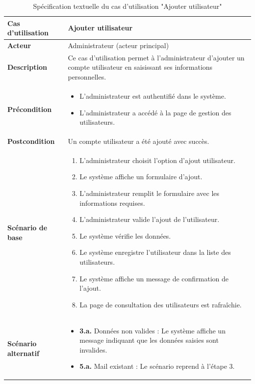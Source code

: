 \documentclass[a4paper,11pt]{report}
\begin{document}
\begin{table}[H]
  \centering
  \renewcommand{\arraystretch}{1.5}
  \caption{Spécification textuelle du cas d'utilisation "Ajouter utilisateur"}
  \begin{tabularx}{\textwidth}{|l|X|}
    \hline
    \textbf{Cas d'utilisation} & Ajouter utilisateur \\ \hline
    \textbf{Acteur} & Administrateur (acteur principal) \\ \hline
    \textbf{Description} & Ce cas d'utilisation permet à l'administrateur d’ajouter un compte utilisateur en saisissant ses informations personnelles. \\ \hline
    \textbf{Précondition} &
    \begin{itemize}[leftmargin=*]
      \item L’administrateur est authentifié dans le système.
      \item L’administrateur a accédé à la page de gestion des utilisateurs.
    \end{itemize} \\ \hline
    \textbf{Postcondition} & Un compte utilisateur a été ajouté avec succès. \\ \hline
    \textbf{Scénario de base} &
    \begin{enumerate}[leftmargin=*]
      \item L’administrateur choisit l’option d’ajout utilisateur.
      \item Le système affiche un formulaire d’ajout.
      \item L’administrateur remplit le formulaire avec les informations requises.
      \item L’administrateur valide l’ajout de l’utilisateur.
      \item Le système vérifie les données.
      \item Le système enregistre l’utilisateur dans la liste des utilisateurs.
      \item Le système affiche un message de confirmation de l’ajout.
      \item La page de consultation des utilisateurs est rafraîchie.
    \end{enumerate} \\ \hline
    \textbf{Scénario alternatif} &
    \begin{itemize}[leftmargin=*]
      \item \textbf{3.a.} Données non valides : Le système affiche un message indiquant que les données saisies sont invalides.
      \item \textbf{5.a.} Mail existant : Le scénario reprend à l'étape 3.
    \end{itemize} \\ \hline
  \end{tabularx}
\end{table}
\end{document}

